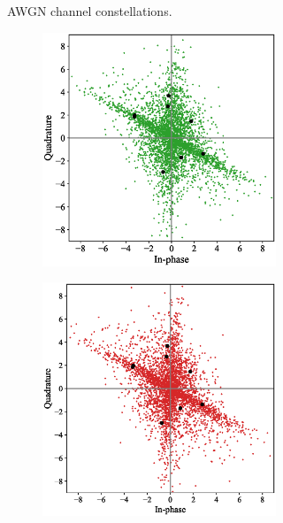 \begin{figure}[tp!]
\begin{subfigure}{0.325\linewidth}
\begin{subfigure}{0.48\textwidth}
		\end{subfigure}
		\caption{AWGN channel constellations.}
		\label{fig:awgn_constellation}
	\end{subfigure}
	\begin{subfigure}{0.325\linewidth}
		\begin{subfigure}{0.48\textwidth}
			\includegraphics[width=\linewidth]{figs/rayleigh_normal_constellation}
		\end{subfigure}
		\hfill
		\begin{subfigure}{0.48\textwidth}
			\includegraphics[width=\linewidth]{figs/rayleigh_covert_constellation}

\end{subfigure}
\end{subfigure}
\end{figure}
